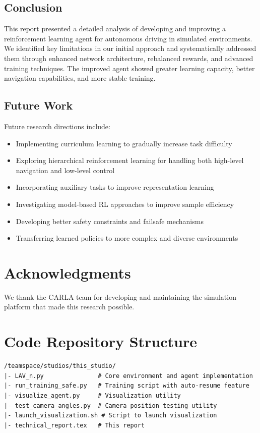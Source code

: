 \documentclass[11pt,a4paper]{article}
\begin{document}
\subsection{Conclusion}
This report presented a detailed analysis of developing and improving a reinforcement learning agent for autonomous driving in simulated environments. We identified key limitations in our initial approach and systematically addressed them through enhanced network architecture, rebalanced rewards, and advanced training techniques. The improved agent showed greater learning capacity, better navigation capabilities, and more stable training.

\subsection{Future Work}
Future research directions include:
\begin{itemize}
    \item Implementing curriculum learning to gradually increase task difficulty
    \item Exploring hierarchical reinforcement learning for handling both high-level navigation and low-level control
    \item Incorporating auxiliary tasks to improve representation learning
    \item Investigating model-based RL approaches to improve sample efficiency
    \item Developing better safety constraints and failsafe mechanisms
    \item Transferring learned policies to more complex and diverse environments
\end{itemize}

\section{Acknowledgments}
We thank the CARLA team for developing and maintaining the simulation platform that made this research possible.




\appendix
\section{Code Repository Structure}
\begin{verbatim}
/teamspace/studios/this_studio/
|- LAV_n.py               # Core environment and agent implementation
|- run_training_safe.py   # Training script with auto-resume feature
|- visualize_agent.py     # Visualization utility
|- test_camera_angles.py  # Camera position testing utility
|- launch_visualization.sh # Script to launch visualization
|- technical_report.tex   # This report
\end{verbatim}
\end{document}
